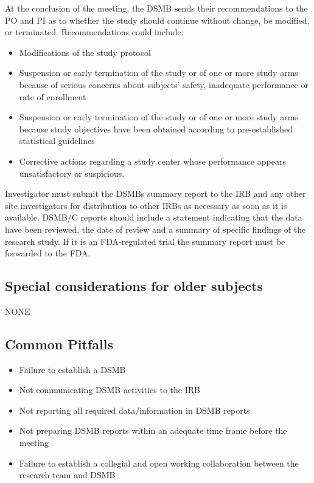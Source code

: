 \documentclass[]{book}
\providecommand{\tightlist}{%
  \setlength{\itemsep}{0pt}\setlength{\parskip}{0pt}}
\theoremstyle{definition}
\theoremstyle{definition}
\theoremstyle{definition}
\theoremstyle{remark}
\begin{document}
At the conclusion of the meeting, the DSMB sends their recommendations
to the PO and PI as to whether the study should continue without change,
be modified, or terminated. Recommendations could include:

\begin{itemize}
\item
  Modifications of the study protocol
\item
  Suspension or early termination of the study or of one or more study
  arms because of serious concerns about subjects' safety, inadequate
  performance or rate of enrollment
\item
  Suspension or early termination of the study or of one or more study
  arms because study objectives have been obtained according to
  pre-established statistical guidelines
\item
  Corrective actions regarding a study center whose performance appears
  unsatisfactory or suspicious.
\end{itemize}

Investigator must submit the DSMBs summary report to the IRB and any
other site investigators for distribution to other IRBs as necessary as
soon as it is available. DSMB/C reports should include a statement
indicating that the data have been reviewed, the date of review and a
summary of specific findings of the research study. If it is an
FDA-regulated trial the summary report must be forwarded to the FDA.

\subsection{Special considerations for older
subjects}\label{special-considerations-for-older-subjects-4}

NONE

\subsection{Common Pitfalls}\label{common-pitfalls-7}

\begin{itemize}
\tightlist
\item
  Failure to establish a DSMB
\item
  Not communicating DSMB activities to the IRB
\item
  Not reporting all required data/information in DSMB reports
\item
  Not preparing DSMB reports within an adequate time frame before the
  meeting
\item
  Failure to establish a collegial and open working collaboration
  between the research team and DSMB
\end{itemize}
\end{document}
